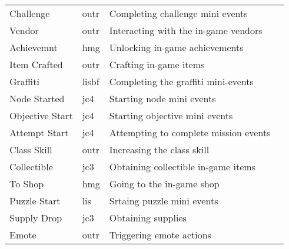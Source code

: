 \begin{table}[H]
\begin{tabularx}{\textwidth}{@{}lllX@{}}
Challenge                               & outr                                      & Completing challenge mini events                                 \\
Vendor                                  & outr                                      & Interacting with the in-game vendors                             \\
Achievemnt                              & hmg                                       & Unlocking in-game achievements                                   \\
Item Crafted                            & outr                                      & Crafting in-game items                                           \\
Graffiti                                & lisbf                                     & Completing the graffiti mini-events                              \\
Node Started                            & jc4                                       & Starting  node mini events                                       \\
Objective Start                         & jc4                                       & Starting objective mini events                                   \\
Attempt Start                           & jc4                                       & Attempting to complete mission events                            \\
Class Skill                             & outr                                      & Increasing the class skill                                       \\
Collectible                             & jc3                                       & Obtaining collectible in-game items                              \\
To Shop                                 & hmg                                       & Going to the in-game shop                                        \\
Puzzle Start                            & lis                                       & Srtaing puzzle mini events                                       \\
Supply Drop                             & jc3                                       & Obtaining supplies                                               \\
Emote                                   & outr                                      & Triggering emote actions                                         \\

\end{tabularx}
\end{table}
